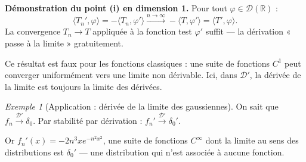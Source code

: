 \documentclass[12pt,a4paper,openany]{book}
\theoremstyle{definition}
\theoremstyle{plain}
\theoremstyle{remark}
\newtheorem*{example}{Exemple}
\begin{document}
	\textbf{Démonstration du point (i) en dimension 1.} Pour tout $\varphi \in \mathcal{D}(\mathbb{R})$ :
	\[
	\langle T_n', \varphi \rangle = -\langle T_n, \varphi' \rangle \xrightarrow{n \to \infty} -\langle T, \varphi' \rangle = \langle T', \varphi \rangle.
	\]
	La convergence $T_n \to T$ appliquée à la fonction test $\varphi'$ suffit — la dérivation « passe à la limite » gratuitement.
	
	Ce résultat est faux pour les fonctions classiques : une suite de fonctions $C^1$ peut converger uniformément vers une limite non dérivable. Ici, dans $\mathcal{D}'$, la dérivée de la limite est toujours la limite des dérivées.
	
	\begin{example}[Application : dérivée de la limite des gaussiennes]
		On sait que $f_n \xrightarrow{\mathcal{D}'} \delta_0$. Par stabilité par dérivation : $f_n' \xrightarrow{\mathcal{D}'} \delta_0'$.
		
		Or $f_n'(x) = -2 n^3 x e^{-n^2 x^2}$, une suite de fonctions $C^\infty$ dont la limite au sens des distributions est $\delta_0'$ — une distribution qui n'est associée à aucune fonction.
	\end{example}
	
\end{document}
